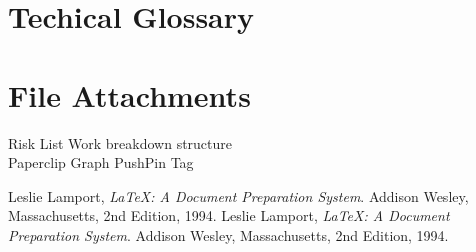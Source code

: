 \documentclass[12pt]{article}
\begin{document}
\appendix
\section{Techical Glossary}\label{glossary}
    
\section{File Attachments}\label{attachments}
     Risk List
     Work breakdown structure
    \\
     Paperclip
     Graph
     PushPin
     Tag




\begin{thebibliography}{0}
     Leslie Lamport,
        \emph{\LaTeX: A Document Preparation System}.
        Addison Wesley, Massachusetts,
        2nd Edition,
        1994.
        Leslie Lamport,
        \emph{\LaTeX: A Document Preparation System}.
        Addison Wesley, Massachusetts,
        2nd Edition,
        1994.
\end{thebibliography}
\end{document}
